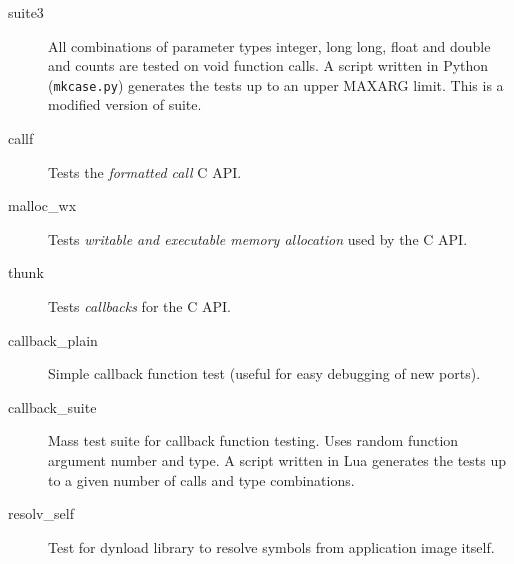 \begin{description}
\item [suite3]
All combinations of parameter types integer, long long, float and double and
counts are tested on void function calls.
A script written in Python ({\tt mkcase.py}) generates the tests up to
an upper MAXARG limit.
This is a modified version of suite.

\item [callf]
Tests the \emph{formatted call}  C API.

\item [malloc\_wx]
Tests \emph{writable and executable memory allocation} used by the
 C API.

\item [thunk]
Tests \emph{callbacks} for the  C API.

\item [callback\_plain]
Simple callback function test (useful for easy debugging of new ports).

\item [callback\_suite]
Mass test suite for callback function testing. Uses random function argument
number and type.
A script written in Lua generates the tests up to a given number of calls and
type combinations.

\item [resolv\_self]
Test for dynload library to resolve symbols from application image itself.

\end{description}

